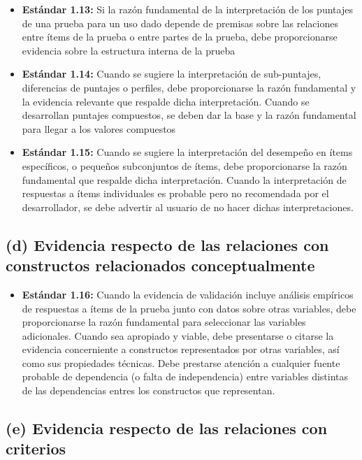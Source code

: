 \documentclass[
  letterpaper,
  DIV=11,
  numbers=noendperiod]{scrreprt}
\providecommand{\tightlist}{%
  \setlength{\itemsep}{0pt}\setlength{\parskip}{0pt}}
\begin{document}
\begin{itemize}
\tightlist
\item
  \textbf{Estándar 1.13:} Si la razón fundamental de la interpretación
  de los puntajes de una prueba para un uso dado depende de premisas
  sobre las relaciones entre ítems de la prueba o entre partes de la
  prueba, debe proporcionarse evidencia sobre la estructura interna de
  la prueba
\item
  \textbf{Estándar 1.14:} Cuando se sugiere la interpretación de
  sub-puntajes, diferencias de puntajes o perfiles, debe proporcionarse
  la razón fundamental y la evidencia relevante que respalde dicha
  interpretación. Cuando se desarrollan puntajes compuestos, se deben
  dar la base y la razón fundamental para llegar a los valores
  compuestos
\item
  \textbf{Estándar 1.15:} Cuando se sugiere la interpretación del
  desempeño en ítems específicos, o pequeños subconjuntos de ítems, debe
  proporcionarse la razón fundamental que respalde dicha interpretación.
  Cuando la interpretación de respuestas a ítems individuales es
  probable pero no recomendada por el desarrollador, se debe advertir al
  usuario de no hacer dichas interpretaciones.
\end{itemize}

\subsection{(d) Evidencia respecto de las relaciones con constructos
relacionados
conceptualmente}\label{d-evidencia-respecto-de-las-relaciones-con-constructos-relacionados-conceptualmente}

\begin{itemize}
\tightlist
\item
  \textbf{Estándar 1.16:} Cuando la evidencia de validación incluye
  análisis empíricos de respuestas a ítems de la prueba junto con datos
  sobre otras variables, debe proporcionarse la razón fundamental para
  seleccionar las variables adicionales. Cuando sea apropiado y viable,
  debe presentarse o citarse la evidencia concerniente a constructos
  representados por otras variables, así como sus propiedades técnicas.
  Debe prestarse atención a cualquier fuente probable de dependencia (o
  falta de independencia) entre variables distintas de las dependencias
  entres los constructos que representan.
\end{itemize}

\subsection{(e) Evidencia respecto de las relaciones con
criterios}\label{e-evidencia-respecto-de-las-relaciones-con-criterios}
\end{document}
